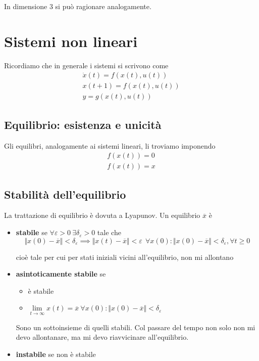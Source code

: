 In dimensione $3$ si può ragionare analogamente.

\chapter{Sistemi non lineari}

Ricordiamo che in generale i sistemi si scrivono come
\begin{gather*}
	\dot{x}(t) =f(x(t) ,u(t))\\
	x(t+1) =f(x(t) ,u(t))\\
    y = g(x(t),u(t))
\end{gather*}

\section{Equilibrio: esistenza e unicità}

Gli equilibri, analogamente ai sistemi lineari, li troviamo imponendo
\begin{gather*}
	f(x(t)) =0\\
	f(x(t)) =x
\end{gather*}

\section{Stabilità dell'equilibrio}

La trattazione di equilibrio è dovuta a Lyapunov. Un equilibrio $\overline x$ è
\begin{itemize}
	\item \textbf{stabile} se $\forall \varepsilon  >0\ \exists \delta _{\varepsilon }  >0$ tale che\begin{equation*}
	      \Vert x(0) -\overline{x}\Vert < \delta _{\varepsilon } \implies \Vert x(t) -\overline{x}\Vert < \varepsilon \ \ \forall x(0) :\Vert x(0) -\overline{x}\Vert < \delta _{\varepsilon } ,\forall t\geq 0
	\end{equation*}
	
	cioè tale per cui per stati iniziali vicini all'equilibrio, non mi allontano
	\item \textbf{asintoticamente stabile} se
	      \begin{itemize}
	      	\item è stabile
	      	\item $\lim\limits _{t\to \infty } x(t) =\overline{x} \ \forall x(0) :\Vert x(0) -\overline{x}\Vert < \delta _{\varepsilon }$
	      \end{itemize}
	      
	      Sono un sottoinsieme di quelli stabili. Col passare del tempo non solo non mi devo allontanare, ma mi devo riavvicinare all'equilibrio.
	\item \textbf{instabile} se non è stabile
\end{itemize}

